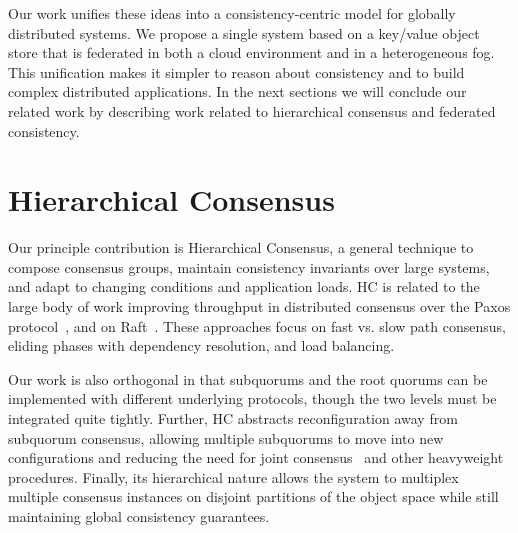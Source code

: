 Our work unifies these ideas into a consistency-centric model for globally distributed systems.
We propose a single system based on a key/value object store that is federated in both a cloud environment and in a heterogeneous fog.
This unification makes it simpler to reason about consistency and to build complex distributed applications.
In the next sections we will conclude our related work by describing work related to hierarchical consensus and federated consistency.

\section{Hierarchical Consensus}

Our principle contribution is Hierarchical Consensus, a general technique to compose consensus groups, maintain consistency invariants over large systems, and adapt to changing conditions and application loads.
HC is related to the large body of work improving throughput in distributed consensus over the Paxos protocol~\cite{paxos,epaxos,fexible_paxos,generalized_paxos}, and on Raft~\cite{raft,raft_refloated}.
These approaches focus on fast vs. slow path consensus, eliding phases with dependency resolution, and load balancing.

Our work is also orthogonal in that subquorums and the root quorums can be implemented with different underlying protocols, though the two levels must be integrated quite tightly.
Further, HC abstracts reconfiguration away from subquorum consensus, allowing multiple subquorums to move into new configurations and reducing the need for joint consensus~\cite{raft} and other heavyweight procedures.
Finally, its hierarchical nature allows the system to multiplex multiple consensus instances on disjoint partitions of the object space while still maintaining global consistency guarantees.
%

